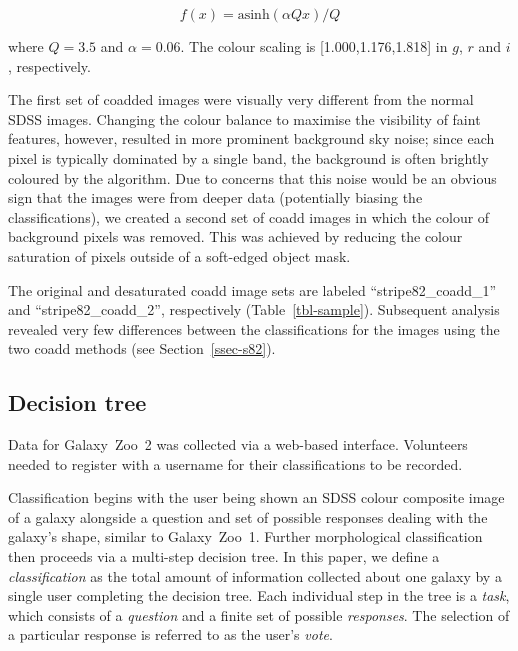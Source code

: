 \documentclass[useAMS,usenatbib]{mn2e}
\begin{document}
\begin{equation}
f(x)=\text{asinh}(\alpha Q x)/Q         %
\label{eqn-imagegen}
\end{equation}

\noindent where $Q=3.5$ and $\alpha=0.06$. The colour scaling is [1.000,1.176,1.818] in $g$, $r$ and $i$, respectively. 

The first set of coadded images were visually very different from the normal SDSS images. Changing the colour balance to maximise the visibility of faint features, however, resulted in more prominent background sky noise; since each pixel is typically dominated by a single band, the background is often brightly coloured by the \citet{lup04} algorithm. Due to concerns that this noise would be an obvious sign that the images were from deeper data (potentially biasing the classifications), we created a second set of coadd images in which the colour of background pixels was removed. This was achieved by reducing the colour saturation of pixels outside of a soft-edged object mask. 

The original and desaturated coadd image sets are labeled ``stripe82\_coadd\_1'' and ``stripe82\_coadd\_2'', respectively (Table~\ref{tbl-sample}). Subsequent analysis revealed very few differences between the classifications for the images using the two coadd methods (see Section~\ref{ssec-s82}). 

\subsection{Decision tree}\label{ssec-decision_tree}

Data for Galaxy~Zoo~2 was collected via a web-based interface. Volunteers needed to register with a username for their classifications to be recorded.

Classification begins with the user being shown an SDSS colour composite image of a galaxy alongside a question and set of possible responses dealing with the galaxy's shape, similar to Galaxy~Zoo~1. Further morphological classification then proceeds via a multi-step decision tree. In this paper, we define a {\it classification} as the total amount of information collected about one galaxy by a single user completing the decision tree. Each individual step in the tree is a {\it task}, which consists of a {\it question} and a finite set of possible {\it responses}. The selection of a particular response is referred to as the user's {\it vote}.  
\end{document}
